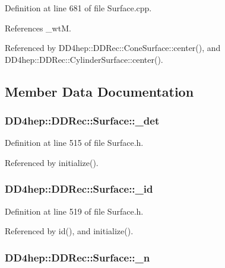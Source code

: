 Definition at line 681 of file Surface.cpp.

References \_\-wtM.

Referenced by DD4hep::DDRec::ConeSurface::center(), and DD4hep::DDRec::CylinderSurface::center().

\subsection{Member Data Documentation}
\hypertarget{class_d_d4hep_1_1_d_d_rec_1_1_surface_a41a9849864ae0888964242798aaaa8e8}{
\subsubsection[{\_\-det}]{ {\bf DD4hep::DDRec::Surface::\_\-det}}}
\label{class_d_d4hep_1_1_d_d_rec_1_1_surface_a41a9849864ae0888964242798aaaa8e8}


Definition at line 515 of file Surface.h.

Referenced by initialize().\hypertarget{class_d_d4hep_1_1_d_d_rec_1_1_surface_a14744685350bb3023c3e2efe02f8d707}{
\subsubsection[{\_\-id}]{ {\bf DD4hep::DDRec::Surface::\_\-id}}}
\label{class_d_d4hep_1_1_d_d_rec_1_1_surface_a14744685350bb3023c3e2efe02f8d707}


Definition at line 519 of file Surface.h.

Referenced by id(), and initialize().\hypertarget{class_d_d4hep_1_1_d_d_rec_1_1_surface_a9191ee82058481753f4d5d5234415382}{
\subsubsection[{\_\-n}]{ {\bf DD4hep::DDRec::Surface::\_\-n}}}
\label{class_d_d4hep_1_1_d_d_rec_1_1_surface_a9191ee82058481753f4d5d5234415382}


